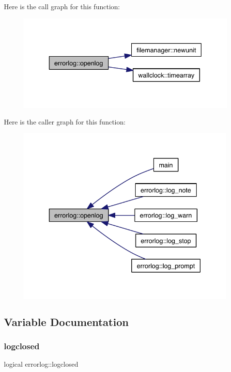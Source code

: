 Here is the call graph for this function\+:\nopagebreak
\begin{figure}[H]
\begin{center}
\leavevmode
\includegraphics[width=316pt]{namespaceerrorlog_a32bbf87dd265de25bd10ea31d95b751d_cgraph}
\end{center}
\end{figure}
Here is the caller graph for this function\+:\nopagebreak
\begin{figure}[H]
\begin{center}
\leavevmode
\includegraphics[width=314pt]{namespaceerrorlog_a32bbf87dd265de25bd10ea31d95b751d_icgraph}
\end{center}
\end{figure}


\subsection{Variable Documentation}
\mbox{\label{namespaceerrorlog_af9add736038cc71b13ee19df6544f3e5}} 
\subsubsection{\texorpdfstring{logclosed}{logclosed}}
{\footnotesize\ttfamily logical errorlog\+::logclosed\hspace{0.3cm}{\ttfamily [private]}}

